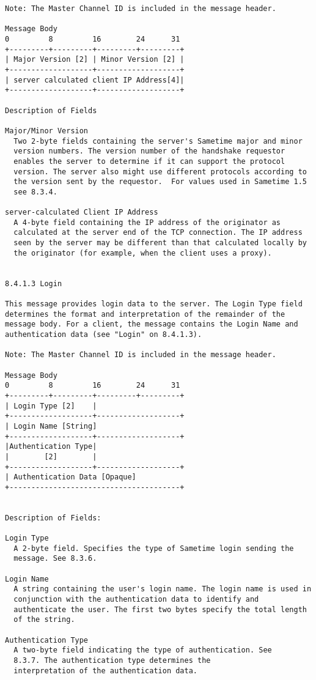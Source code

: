 \documentclass[titlepage,oneside]{book}
\begin{document}
\begin{verbatim}
Note: The Master Channel ID is included in the message header.

Message Body
0         8         16        24      31
+---------+---------+---------+---------+
| Major Version [2] | Minor Version [2] |
+-------------------+-------------------+
| server calculated client IP Address[4]|
+-------------------+-------------------+

Description of Fields

Major/Minor Version
  Two 2-byte fields containing the server's Sametime major and minor
  version numbers. The version number of the handshake requestor
  enables the server to determine if it can support the protocol
  version. The server also might use different protocols according to
  the version sent by the requestor.  For values used in Sametime 1.5
  see 8.3.4.

server-calculated Client IP Address
  A 4-byte field containing the IP address of the originator as
  calculated at the server end of the TCP connection. The IP address
  seen by the server may be different than that calculated locally by
  the originator (for example, when the client uses a proxy).


8.4.1.3 Login

This message provides login data to the server. The Login Type field
determines the format and interpretation of the remainder of the
message body. For a client, the message contains the Login Name and
authentication data (see "Login" on 8.4.1.3).

Note: The Master Channel ID is included in the message header.

Message Body
0         8         16        24      31
+---------+---------+---------+---------+
| Login Type [2]    |
+-------------------+-------------------+
| Login Name [String]
+-------------------+-------------------+
|Authentication Type|
|        [2]        |
+-------------------+-------------------+
| Authentication Data [Opaque]
+---------------------------------------+


Description of Fields:

Login Type
  A 2-byte field. Specifies the type of Sametime login sending the
  message. See 8.3.6.

Login Name
  A string containing the user's login name. The login name is used in
  conjunction with the authentication data to identify and
  authenticate the user. The first two bytes specify the total length
  of the string.

Authentication Type
  A two-byte field indicating the type of authentication. See 
  8.3.7. The authentication type determines the 
  interpretation of the authentication data.


\end{verbatim}
\end{document}
